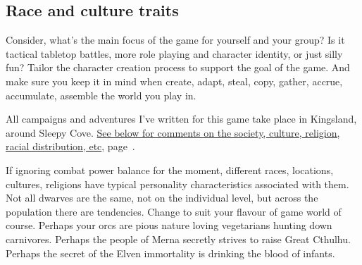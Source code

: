 \subsection*{Race and culture traits}
Consider, what's the main focus of the game for yourself and your group? Is it tactical tabletop battles, more role playing and character identity, or just silly fun? Tailor the character creation process to support the goal of the game. And make sure you keep it in mind when create, adapt, steal, copy, gather, accrue, accumulate, assemble the world you play in.

All campaigns and adventures I've written for this game take place in Kingsland, around Sleepy Cove. \hyperref[sec:kingslandsociety]{See below for comments on the society, culture, religion, racial distribution, etc}, page~\pageref{sec:kingslandsociety}.

If ignoring combat power balance for the moment, different races, locations, cultures, religions have typical personality characteristics associated with them. Not all dwarves are the same, not on the individual level, but across the population there are tendencies. Change to suit your flavour of game world of course. Perhaps your orcs are pious nature loving vegetarians hunting down carnivores. Perhaps the people of Merna secretly strives to raise Great Cthulhu. Perhaps the secret of the Elven immortality is drinking the blood of infants.

